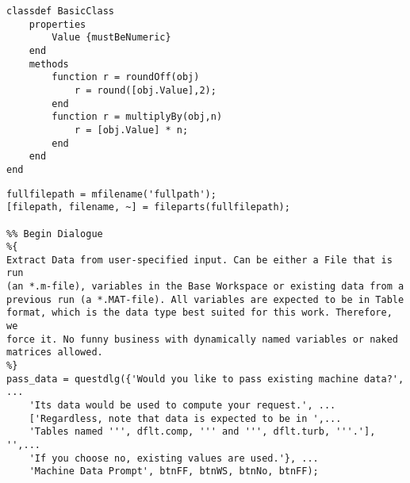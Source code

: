 \begin{listing}
    \begin{verbatim}
classdef BasicClass
    properties
        Value {mustBeNumeric}
    end
    methods
        function r = roundOff(obj)
            r = round([obj.Value],2);
        end
        function r = multiplyBy(obj,n)
            r = [obj.Value] * n;
        end
    end
end
    \end{verbatim}
    \caption[A class definition in MATLAB]{%
        A class definition in MATLAB, from \cite{mathworks_create_2020}%
    }
    \label{lst:matlab_class_definition}
\end{listing}

\begin{verbatim}
fullfilepath = mfilename('fullpath');
[filepath, filename, ~] = fileparts(fullfilepath);

%% Begin Dialogue
%{
Extract Data from user-specified input. Can be either a File that is run
(an *.m-file), variables in the Base Workspace or existing data from a
previous run (a *.MAT-file). All variables are expected to be in Table
format, which is the data type best suited for this work. Therefore, we
force it. No funny business with dynamically named variables or naked
matrices allowed.
%}
pass_data = questdlg({'Would you like to pass existing machine data?', ...
    'Its data would be used to compute your request.', ...
    ['Regardless, note that data is expected to be in ',...
    'Tables named ''', dflt.comp, ''' and ''', dflt.turb, '''.'], '',...
    'If you choose no, existing values are used.'}, ...
    'Machine Data Prompt', btnFF, btnWS, btnNo, btnFF);


\end{verbatim}

